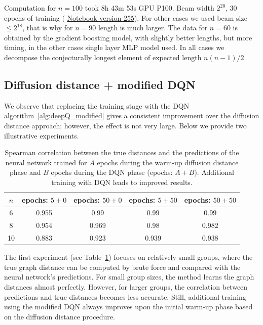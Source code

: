 \documentclass[reqno,11pt]{amsart}
\begin{document}
Computation for $n=100$ took 8h 43m 53s GPU P100. Beam width $ {2}^{20}$, 30 epochs of training ( \href{https://www.kaggle.com/code/alexandervc/lrx-cayleypy-rl-mdqn?scriptVersionId=223954525}{Notebook version 255}). For other cases we used beam size $\le {2}^{18}$, that is why for $n=90$ length is much larger. The data for $n=60$ is obtained by the gradient boosting model, with slightly better lengths, but more timing, in the other cases single layer MLP model used. In all cases we decompose the conjecturally longest element of expected length $n(n-1)/2$. 

\subsection{Diffusion distance + modified DQN}
We observe that replacing the training stage with the DQN algorithm~\ref{alg:deepQ_modified} gives a consistent improvement over the diffusion distance approach; however, the effect is not very large. Below we provide two illustrative experiments.

\begin{table}[ht]
    \centering
    \begin{tabular}{|c|c|c|c|c|}
        \hline
        $n$  & epochs: $5+0$  & epochs: $50+0$   & epochs: $5+50$   & epochs: $50+50$ \\
        \hline\hline
        6 &  0.955 & 0.99  & 0.99  & 0.99 \\
        \hline
        8 &  0.954 & 0.969 & 0.98   & 0.982 \\
        \hline
        10 & 0.883  & 0.923 & 0.939   &  0.938 \\
        \hline
    \end{tabular}
    \captionsetup{skip=10pt} 
    \caption{Spearman correlation between the true distances and the predictions of the neural network trained for $A$ epochs during the warm-up diffusion distance phase and $B$ epochs during the DQN phase (epochs: $A+ B$). Additional training with DQN leads to improved results.}
    \label{tab:DQN_small}
\end{table}

The first experiment (see Table~\ref{tab:DQN_small}) focuses on relatively small groups, where the true graph distance can be computed by brute force and compared with the neural network's predictions. For small group sizes, the method learns the graph distances almost perfectly. However, for larger groups, the correlation between predictions and true distances becomes less accurate. Still, additional training using the modified DQN always improves upon the initial warm-up phase based on the diffusion distance procedure.  
\end{document}
